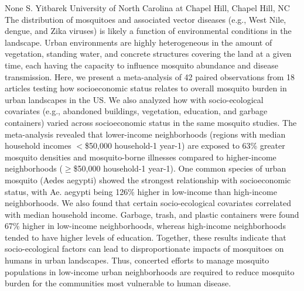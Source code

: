 
    \begin{abstract_online}{None}{%
        S. Yitbarek}{%
        }{%
        University of North Carolina at Chapel Hill, Chapel Hill, NC}
    The distribution of mosquitoes and associated vector diseases (e.g., West Nile, dengue, and Zika viruses) is likely a function of environmental conditions in the landscape. Urban environments are highly heterogeneous in the amount of vegetation, standing water, and concrete structures covering the land at a given time, each having the capacity to influence mosquito abundance and disease transmission. Here, we present a meta-analysis of 42 paired observations from 18 articles testing how socioeconomic status relates to overall mosquito burden in urban landscapes in the US. We also analyzed how with socio-ecological covariates (e.g., abandoned buildings, vegetation, education, and garbage containers) varied across socioeconomic status in the same mosquito studies. The meta-analysis revealed that lower-income neighborhoods (regions with median household incomes $<$\$50,000 household-1 year-1) are exposed to 63\% greater mosquito densities and mosquito-borne illnesses compared to higher-income neighborhoods ($\geq$\$50,000 household-1 year-1). One common species of urban mosquito (Aedes aegypti) showed the strongest relationship with socioeconomic status, with Ae. aegypti being 126\% higher in low-income than high-income neighborhoods. We also found that certain socio-ecological covariates correlated with median household income. Garbage, trash, and plastic containers were found 67\% higher in low-income neighborhoods, whereas high-income neighborhoods tended to have higher levels of education. Together, these results indicate that socio-ecological factors can lead to disproportionate impacts of mosquitoes on humans in urban landscapes. Thus, concerted efforts to manage mosquito populations in low-income urban neighborhoods are required to reduce mosquito burden for the communities most vulnerable to human disease. 
    
    \end{abstract_online}
    